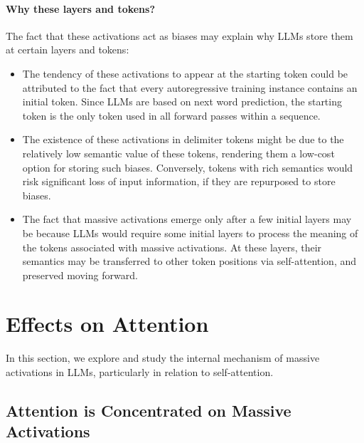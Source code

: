 \documentclass[10pt]{article}
\begin{document}
\paragraph{Why these layers and tokens?} The fact that these activations act as biases may explain why LLMs store them at certain layers and tokens:
\begin{itemize}[topsep=-1.5pt,itemsep=-.5ex]
    \item The tendency of these activations to appear at the starting token could be attributed to the fact that every autoregressive training instance contains an initial token. Since LLMs are based on next word prediction, the starting token is the only token used in all forward passes within a sequence.
    \item The existence of these activations in delimiter tokens might be due to the relatively low semantic value of these tokens, rendering them a low-cost option for storing such biases. Conversely, tokens with rich semantics would risk significant loss of input information, if they are repurposed to store biases.
    \item The fact that massive activations emerge only after a few initial layers may be because LLMs would require some initial layers to process the meaning of the tokens associated with massive activations. At these layers, their semantics may be transferred to other token positions via self-attention, and preserved moving forward.
\end{itemize}











\section{Effects on Attention}\label{label-attn-bias}
In this section, we explore and study the internal mechanism of massive activations in LLMs, particularly in relation to self-attention. 





\subsection{Attention is Concentrated on Massive Activations}\label{sec-attn-concentrate}
\end{document}

